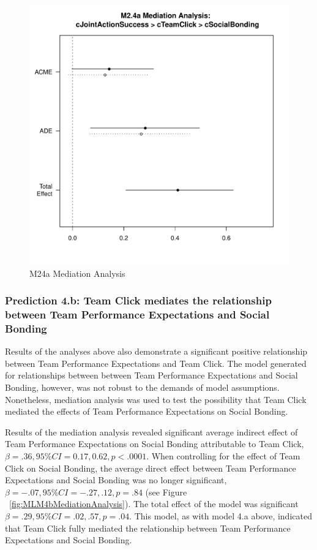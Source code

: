     \begin{figure}[htbp]
      \centering
      \includegraphics[scale=.5]{images/MLM24aMediationAnalysis.pdf}
      \caption{M24a Mediation Analysis}
      \label{fig:MLM24aMediationAnalysis}
    \end{figure}




\subsubsection{Prediction 4.b: Team Click mediates the relationship between Team Performance Expectations and Social Bonding}

  Results of the analyses above also demonstrate a significant positive relationship between Team Performance Expectations and Team Click. The model generated for relationships between between Team Performance Expectations and Social Bonding, however, was not robust to the demands of model assumptions.   Nonetheless, mediation analysis was used to test the possibility that Team Click mediated the effects of Team Performance Expectations on Social Bonding.

  Results of the mediation analysis revealed significant average indirect effect of Team Performance Expectations on Social Bonding attributable to Team Click, $\beta = .36, 95\% CI = 0.17 , 0.62, p < .0001$.  When controlling for the effect of Team Click on Social Bonding, the average direct effect between Team Performance Expectations and Social Bonding was no longer significant, $\beta = -.07, 95\% CI = -.27 , .12, p = .84 $ (see Figure ~\ref{fig:MLM4bMediationAnalysis}). The total effect of the model was significant $\beta = .29, 95\% CI = .02 , .57, p = .04$.  This model, as with model 4.a above, indicated that Team Click fully mediated the relationship between Team Performance Expectations and Social Bonding.


